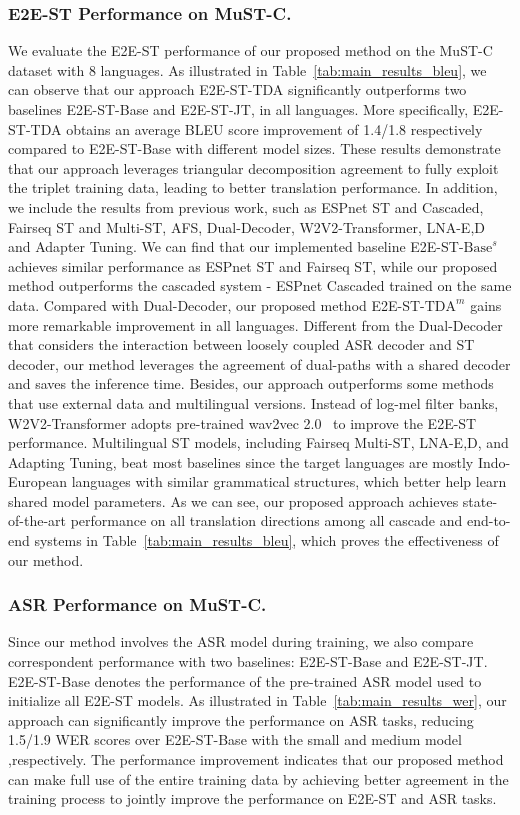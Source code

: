 \documentclass[letterpaper]{article} %
\begin{document}
\subsubsection*{E2E-ST Performance on MuST-C.} 
We evaluate the E2E-ST performance of our proposed method on the MuST-C dataset with 8 languages.
As illustrated in Table~\ref{tab:main_results_bleu}, we can observe that our approach E2E-ST-TDA significantly outperforms two baselines E2E-ST-Base and E2E-ST-JT, in all languages.
More specifically, E2E-ST-TDA obtains an average BLEU score improvement of 1.4/1.8 respectively compared to E2E-ST-Base with different model sizes.
These results demonstrate that our approach leverages triangular decomposition agreement to fully exploit the triplet training data, leading to better translation performance. 
In addition, we include the results from previous work, such as ESPnet ST and Cascaded, Fairseq ST and Multi-ST, AFS, Dual-Decoder, W2V2-Transformer, LNA-E,D and Adapter Tuning.
We can find that our implemented baseline E2E-ST-$\text{Base}^{s}$ achieves similar performance as ESPnet ST and Fairseq ST, while our proposed method outperforms the cascaded system - ESPnet Cascaded trained on the same data.
Compared with Dual-Decoder, our proposed method E2E-ST-$\text{TDA}^{m}$ gains more remarkable improvement in all languages.
Different from the Dual-Decoder that considers the interaction between loosely coupled ASR decoder and ST decoder, our method leverages the agreement of dual-paths with a shared decoder and saves the inference time.
Besides, our approach outperforms some methods that use external data and multilingual versions.
Instead of log-mel filter banks, W2V2-Transformer adopts pre-trained wav2vec 2.0~\cite{Baevski2020wav2vec2A} to improve the E2E-ST performance.
Multilingual ST models, including Fairseq Multi-ST, LNA-E,D, and Adapting Tuning, beat most baselines since the target languages are mostly Indo-European languages with similar grammatical structures, which better help learn shared model parameters.
As we can see, our proposed approach achieves state-of-the-art performance on all translation directions among all cascade and end-to-end systems in Table~\ref{tab:main_results_bleu}, which proves the effectiveness of our method.


\subsubsection*{ASR Performance on MuST-C.} 
Since our method involves the ASR model during training, we also compare correspondent performance with two baselines: E2E-ST-Base and E2E-ST-JT.
E2E-ST-Base denotes the performance of the pre-trained ASR model used to initialize all E2E-ST models.  
As illustrated in Table~\ref{tab:main_results_wer}, our approach can significantly improve the performance on ASR tasks, reducing 1.5/1.9 WER scores over E2E-ST-Base with the small and medium model ,respectively.
The performance improvement indicates that our proposed method can make full use of the entire training data by achieving better agreement in the training process to jointly improve the performance on E2E-ST and ASR tasks.
\end{document}
